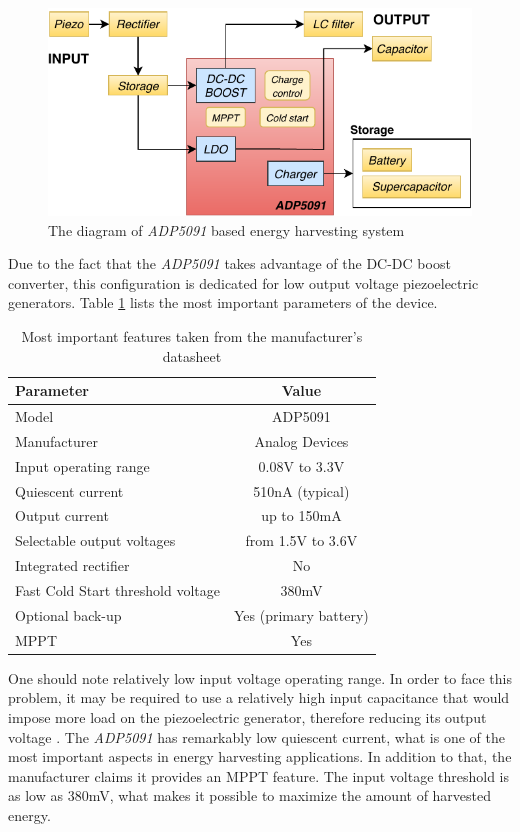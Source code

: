 \documentclass[12pt,a4paper]{article}
\begin{document}
\begin{figure}[ht!]
\includegraphics[scale=1.2]{adp5091.pdf}
\caption{The diagram of \textit{ADP5091} based energy harvesting system}
\label{fig:adp5091diagram}
\end{figure}

Due to the fact that the \textit{ADP5091} takes advantage of the DC-DC boost converter, this configuration is dedicated for low output voltage piezoelectric generators. Table \ref{tab:adp5091_params} lists the most important parameters of the device.
\par

\begin{table}[ht!]
\begin{tabular}{|l|c|}
\hline
\textbf{Parameter}	& \textbf{Value} 	\\ \hline
Model  				& ADP5091       \\ \hline
Manufacturer    	& Analog Devices	\\ \hline
Input operating range      &  0.08V to 3.3V  \\ \hline
Quiescent current     &  510nA (typical)		\\ \hline
Output current        &  up to 150mA			\\ \hline
Selectable output voltages & from 1.5V to 3.6V\\ \hline
Integrated rectifier 	&  No 		\\ \hline
Fast Cold Start threshold voltage 	&  380mV 	\\ \hline
Optional back-up 	&  Yes (primary battery) 	\\ \hline
MPPT 	&  Yes 		\\ \hline
\end{tabular}
\caption{Most important features taken from the manufacturer's datasheet \cite{adp5091_params}}
\label{tab:adp5091_params}
\end{table}
One should note relatively low input voltage operating range. In order to face this problem, it may be required to use a relatively high input capacitance that would impose more load on the piezoelectric generator, therefore reducing its output voltage \cite{EnHv2}. The \textit{ADP5091} has remarkably low quiescent current, what is one of the most important aspects in energy harvesting applications. In addition to that, the manufacturer claims it provides an MPPT feature. The input voltage threshold is as low as 380mV, what makes it possible to maximize the amount of harvested energy. 
\par
\end{document}
